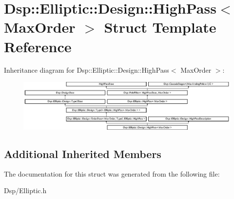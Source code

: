 \hypertarget{structDsp_1_1Elliptic_1_1Design_1_1HighPass}{\section{Dsp\-:\-:Elliptic\-:\-:Design\-:\-:High\-Pass$<$ Max\-Order $>$ Struct Template Reference}
\label{structDsp_1_1Elliptic_1_1Design_1_1HighPass}
}
Inheritance diagram for Dsp\-:\-:Elliptic\-:\-:Design\-:\-:High\-Pass$<$ Max\-Order $>$\-:\begin{figure}[H]
\begin{center}
\leavevmode
\includegraphics[height=2.635294cm]{structDsp_1_1Elliptic_1_1Design_1_1HighPass}
\end{center}
\end{figure}
\subsection*{Additional Inherited Members}


The documentation for this struct was generated from the following file\-:\begin{DoxyCompactItemize}
\item 
Dsp/Elliptic.\-h\end{DoxyCompactItemize}
